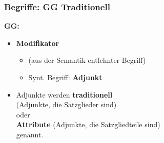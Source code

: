 \begin{frame}
\frametitle{Begriffe: GG \vs Traditionell}

\begin{minipage}[b]{0.45\textwidth}
	\textbf{GG:}
		\begin{itemize}
		\item \textbf{Modifikator}
		
		\begin{itemize}
			\item (aus der Semantik entlehnter Begriff)
			
			\item Synt. Begriff: \textbf{Adjunkt}
		\end{itemize}


		\item Adjunkte werden \textbf{traditionell}\\
		 (Adjunkte, die Satzglieder sind)\\
		oder\\
		\textbf{Attribute} (Adjunkte, die Satzgliedteile sind)\\
		genannt.
		\end{itemize}	
  	\end{minipage}  
\begin{minipage}[b]{0.5\textwidth}
	\centering
\end{minipage}
  
\end{frame}


